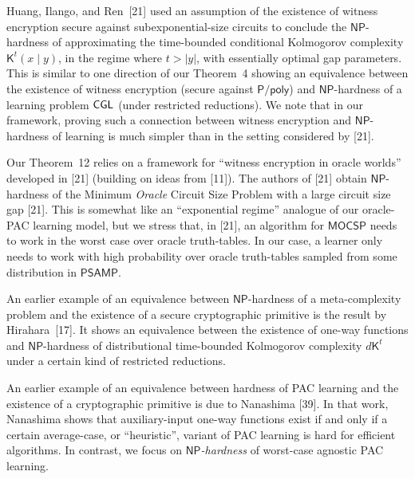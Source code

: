 Huang, Ilango, and Ren [21] used an assumption of the existence of witness encryption secure against subexponential-size circuits to conclude the ${\mathsf{NP}}$-hardness of approximating the time-bounded conditional Kolmogorov complexity ${\mathsf{K}}^{t}(x\mid y)$, in the regime where $t>|y|$, with essentially optimal gap parameters. This is similar to one direction of our Theorem 4 showing an equivalence between the existence of witness encryption (secure against ${\mathsf{P}}/{\mathsf{poly}}$) and ${\mathsf{NP}}$-hardness of a learning problem ${\sf CGL}$ (under restricted reductions). We note that in our framework, proving such a connection between witness encryption and ${\mathsf{NP}}$-hardness of learning is much simpler than in the setting considered by [21].\par




Our Theorem 12 relies on a framework for “witness encryption in oracle worlds” developed in [21] (building on ideas from [11]). The authors of [21] obtain ${\mathsf{NP}}$-hardness of the Minimum \emph{Oracle} Circuit Size Problem with a large circuit size gap [21]. This is somewhat like an “exponential regime” analogue of our oracle-PAC learning model, but we stress that, in [21], an algorithm for ${\mathsf{MOCSP}}$ needs to work in the worst case over oracle truth-tables. In our case, a learner only needs to work with high probability over oracle truth-tables sampled from some distribution in ${\mathsf{P}}{\mathsf{SAMP}}$.\par




An earlier example of an equivalence between ${\mathsf{NP}}$-hardness of a meta-complexity problem and the existence of a secure cryptographic primitive is the result by
Hirahara [17]. It shows an equivalence between the existence of one-way functions and ${\mathsf{NP}}$-hardness of distributional time-bounded Kolmogorov complexity $d{\mathsf{K}}^{t}$ under a certain kind of restricted reductions.\par




An earlier example of an equivalence between hardness of PAC learning and the existence of a cryptographic primitive is due to Nanashima [39]. In that work, Nanashima shows that auxiliary-input one-way functions exist if and only if a certain average-case, or “heuristic”, variant of PAC learning is hard for efficient algorithms. In contrast, we focus on \emph{${\mathsf{NP}}$-hardness} of worst-case agnostic PAC learning.\par





